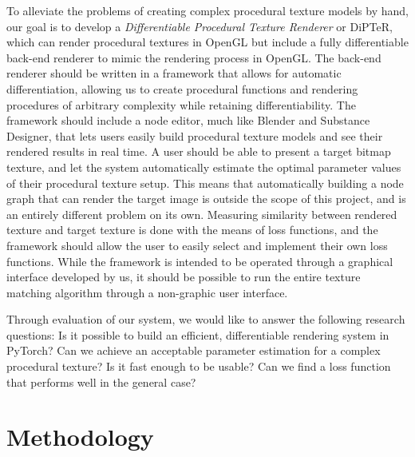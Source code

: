To alleviate the problems of creating complex procedural texture models by hand, our goal is to develop a \textit{Differentiable Procedural Texture Renderer} or DiPTeR, which can render procedural textures in OpenGL but include a fully differentiable back-end renderer to mimic the rendering process in OpenGL. The back-end renderer should be written in a framework that allows for automatic differentiation, allowing us to create procedural functions and rendering procedures of arbitrary complexity while retaining differentiability. The framework should include a node editor, much like Blender and Substance Designer, that lets users easily build procedural texture models and see their rendered results in real time. A user should be able to present a target bitmap texture, and let the system automatically estimate the optimal parameter values of their procedural texture setup. This means that automatically building a node graph that can render the target image is outside the scope of this project, and is an entirely different problem on its own. Measuring similarity between rendered texture and target texture is done with the means of loss functions, and the framework should allow the user to easily select and implement their own loss functions. While the framework is intended to be operated through a graphical interface developed by us, it should be possible to run the entire texture matching algorithm through a non-graphic user interface.

Through evaluation of our system, we would like to answer the following research questions: Is it possible to build an efficient, differentiable rendering system in PyTorch? Can we achieve an acceptable parameter estimation for a complex procedural texture? Is it fast enough to be usable? Can we find a loss function that performs well in the general case?

\section{Methodology}

